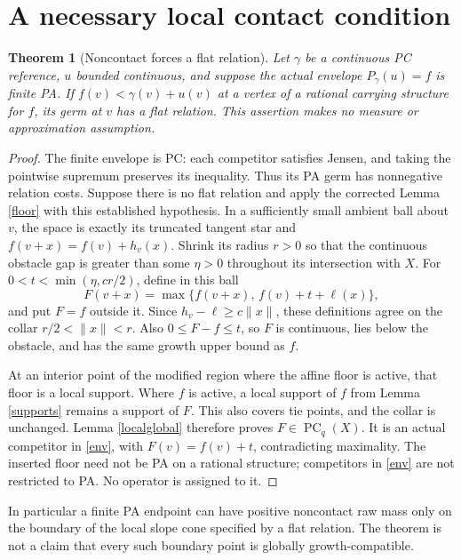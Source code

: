 \documentclass[11pt]{article}
\newtheorem{theorem}{Theorem}
\newcommand{\PC}{\operatorname{PC}}
\begin{document}
\section{A necessary local contact condition}
\begin{theorem}[Noncontact forces a flat relation]\label{necessary}
Let \(\gamma\) be a continuous PC reference, \(u\) bounded continuous,
and suppose the actual envelope \(P_\gamma(u)=f\) is finite PA.
If \(f(v)<\gamma(v)+u(v)\) at a vertex of a rational carrying structure
for \(f\), its germ at \(v\) has a flat relation.
This assertion makes no measure or approximation assumption.
\end{theorem}
\begin{proof}
The finite envelope is PC: each competitor satisfies Jensen, and taking
the pointwise supremum preserves its inequality. Thus its PA germ has
nonnegative relation costs. Suppose there is no flat relation and apply
the corrected Lemma \ref{floor} with this established hypothesis. In a
sufficiently small ambient ball about \(v\), the space is exactly its
truncated tangent star and \(f(v+x)=f(v)+h_v(x)\). Shrink its radius
\(r>0\) so that the continuous obstacle gap is greater than some
\(\eta>0\) throughout its intersection with \(X\).
For \(0<t<\min(\eta,cr/2)\), define in this ball
\[
 F(v+x)=\max\{f(v+x),\,f(v)+t+\ell(x)\},
\]
and put \(F=f\) outside it. Since \(h_v-\ell\geq c\|x\|\), these
definitions agree on the collar \(r/2<\|x\|<r\). Also
\(0\leq F-f\leq t\), so \(F\) is continuous, lies below the obstacle,
and has the same growth upper bound as \(f\).

At an interior point of the modified region where the affine floor is
active, that floor is a local support. Where \(f\) is active, a local
support of \(f\) from Lemma \ref{supports} remains a support of \(F\).
This also covers tie points, and the collar is unchanged. Lemma
\ref{localglobal} therefore proves \(F\in\PC_q(X)\).
It is an actual competitor in \eqref{env}, with \(F(v)=f(v)+t\),
contradicting maximality.
The inserted floor need not be PA on a rational structure; competitors
in \eqref{env} are not restricted to PA. No operator is assigned to it.
\end{proof}

In particular a finite PA endpoint can have positive noncontact raw mass
only on the boundary of the local slope cone specified by a flat
relation. The theorem is not a claim that every such boundary point
is globally growth-compatible.
\end{document}
